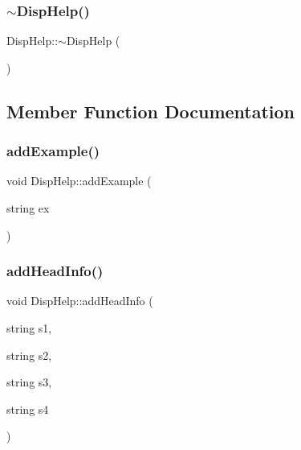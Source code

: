 \mbox{\label{class_disp_help_a2c04f5eec74db7450593e3455a56ffd5}} 
\subsubsection{\texorpdfstring{$\sim$DispHelp()}{~DispHelp()}}
{\footnotesize\ttfamily Disp\+Help\+::$\sim$\+Disp\+Help (\begin{DoxyParamCaption}{ }\end{DoxyParamCaption})\hspace{0.3cm}{\ttfamily [inline]}}



\subsection{Member Function Documentation}
\mbox{\label{class_disp_help_ab483990fe64bdc07e485d84b96079d61}} 
\subsubsection{\texorpdfstring{addExample()}{addExample()}}
{\footnotesize\ttfamily void Disp\+Help\+::add\+Example (\begin{DoxyParamCaption}\item[{string}]{ex }\end{DoxyParamCaption})}

\mbox{\label{class_disp_help_ab174af43e0c86e6ee937b222fe4f371b}} 
\subsubsection{\texorpdfstring{addHeadInfo()}{addHeadInfo()}}
{\footnotesize\ttfamily void Disp\+Help\+::add\+Head\+Info (\begin{DoxyParamCaption}\item[{string}]{s1,  }\item[{string}]{s2,  }\item[{string}]{s3,  }\item[{string}]{s4 }\end{DoxyParamCaption})}

